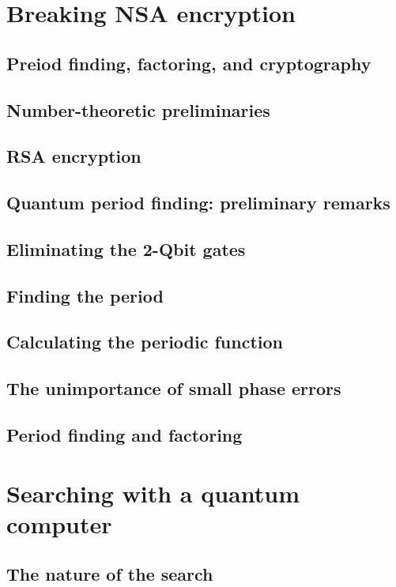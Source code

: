 \documentclass{book}
\theoremstyle{definition}
\begin{document}
\newpage


\section{Breaking NSA encryption}

\subsection{Preiod finding, factoring, and cryptography}
\subsection{Number-theoretic preliminaries}
\subsection{RSA encryption}
\subsection{Quantum period finding: preliminary remarks}
\subsection{Eliminating the 2-Qbit gates}
\subsection{Finding the period}
\subsection{Calculating the periodic function}
\subsection{The unimportance of small phase errors}
\subsection{Period finding and factoring}


\newpage

\section{Searching with a quantum computer}

\subsection{The nature of the search}
\end{document}
